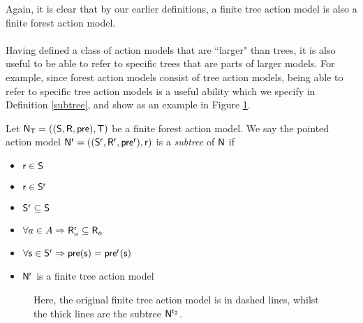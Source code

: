Again, it is clear that by our earlier definitions, a finite tree action model
is also a finite forest action
model.\\
\\
Having defined a class of action models that are ``larger" than trees, it is also useful to be able
to refer to specific trees that are parts of larger models.
For example, since forest action models consist of tree action models, being able to refer to specific
tree action models is a useful ability which we specify in Definition \ref{subtree}, and show as an
example in Figure \ref{figure:subtreeExample}.

\begin{defn} \label{subtree}
Let $\mathrm{\mathsf{N}}_\mathrm{\mathsf{T}} = ((\mathrm{\mathsf{S}}, \mathrm{\mathsf{R}}, \mathrm{\mathsf{pre}}), \mathrm{\mathsf{T}})$ be a finite forest action model.
We say the pointed action model $\mathrm{\mathsf{N}}^{\mathrm{\mathsf{r}}} = ((\mathrm{\mathsf{S}}^{\mathrm{\mathsf{r}}}, \mathrm{\mathsf{R}}^{\mathrm{\mathsf{r}}}, \mathrm{\mathsf{pre}}^{\mathrm{\mathsf{r}}}), \mathrm{\mathsf{r}})$ is a {\em subtree} of $\mathrm{\mathsf{N}}$ if
\begin{itemize}
	\item $\mathrm{\mathsf{r}} \in \mathrm{\mathsf{S}}$
	\item $\mathrm{\mathsf{r}} \in \mathrm{\mathsf{S}}^\mathrm{\mathsf{r}}$
	\item $\mathrm{\mathsf{S}}^\mathrm{\mathsf{r}} \subseteq \mathrm{\mathsf{S}}$
	\item $\forall a \in A \Rightarrow \mathrm{\mathsf{R}}_a^\mathrm{\mathsf{r}} \subseteq \mathrm{\mathsf{R}}_a$
	\item $\forall \mathrm{\mathsf{s}} \in \mathrm{\mathsf{S}}^\mathrm{\mathsf{r}} \Rightarrow \mathrm{\mathsf{pre}}(\mathrm{\mathsf{s}}) = \mathrm{\mathsf{pre}}^\mathrm{\mathsf{r}}(\mathrm{\mathsf{s}}) $
	\item $\mathrm{\mathsf{N}}^\mathrm{\mathsf{r}}$ is a finite tree action model
\end{itemize}
\end{defn}

\begin{figure}
	\centering
{}
	\caption[Example subtrees]{Here, the original finite tree action model is in dashed lines, whilst
	the thick lines are the subtree $\mathrm{\mathsf{N}}^{\mathrm{\mathsf{t}}_2}$.}
	\label{figure:subtreeExample}
\end{figure}

